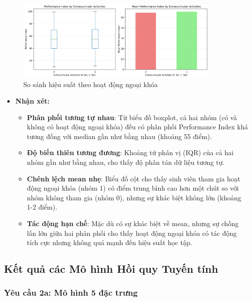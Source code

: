 \begin{figure}[H]
	\centering
	\includegraphics[width=0.9\textwidth]{imgs/figures/figure6_performance_by_extracurricular.png}
	\caption{So sánh hiệu suất theo hoạt động ngoại khóa}
	\label{fig:performance_comparison}
\end{figure}

\begin{itemize}
	\item \textbf{Nhận xét:}
	      \begin{itemize}
		      \item \textbf{Phân phối tương tự nhau}: Từ biểu đồ boxplot, cả hai nhóm (có và không có hoạt động ngoại khóa) đều có phân phối Performance Index khá tương đồng với median gần như bằng nhau (khoảng 55 điểm).
		      \item \textbf{Độ biến thiên tương đương}: Khoảng tứ phân vị (IQR) của cả hai nhóm gần như bằng nhau, cho thấy độ phân tán dữ liệu tương tự.
		      \item \textbf{Chênh lệch mean nhẹ}: Biểu đồ cột cho thấy sinh viên tham gia hoạt động ngoại khóa (nhóm 1) có điểm trung bình cao hơn một chút so với nhóm không tham gia (nhóm 0), nhưng sự khác biệt không lớn (khoảng 1-2 điểm).
		      \item \textbf{Tác động hạn chế}: Mặc dù có sự khác biệt về mean, nhưng sự chồng lấn lớn giữa hai phân phối cho thấy hoạt động ngoại khóa có tác động tích cực nhưng không quá mạnh đến hiệu suất học tập.
	      \end{itemize}
\end{itemize}

\subsection{Kết quả các Mô hình Hồi quy Tuyến tính}

\subsubsection{Yêu cầu 2a: Mô hình 5 đặc trưng}

